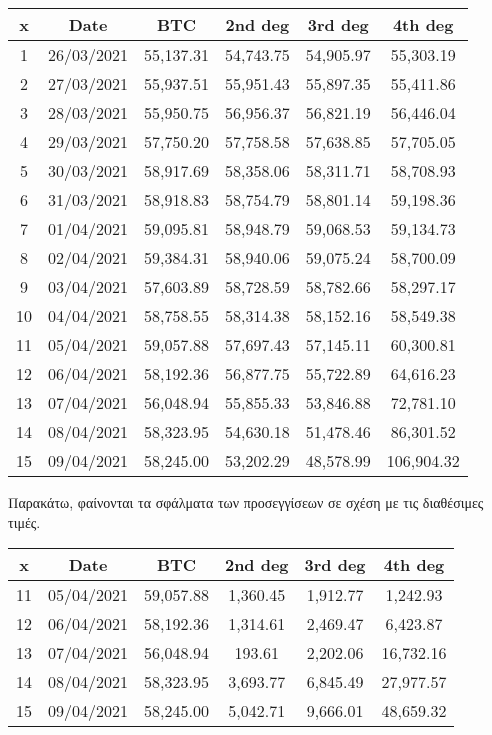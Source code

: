 \documentclass{article}
\newcommand{\lt}{\latintext}
\newcommand{\gt}{\greektext}
\begin{document}
\lt
\begin{center}
\begin{tabular}{ |c|c|c|c|c|c| }
\hline
x & Date & BTC & 2nd deg & 3rd deg & 4th deg \\
\hline
1 & 26/03/2021 & 55,137.31 & 54,743.75 & 54,905.97 & 55,303.19\\
2 & 27/03/2021 & 55,937.51 & 55,951.43 & 55,897.35 & 55,411.86\\
3 & 28/03/2021 & 55,950.75 & 56,956.37 & 56,821.19 & 56,446.04\\
4 & 29/03/2021 & 57,750.20 & 57,758.58 & 57,638.85 & 57,705.05\\
5 & 30/03/2021 & 58,917.69 & 58,358.06 & 58,311.71 & 58,708.93\\
6 & 31/03/2021 & 58,918.83 & 58,754.79 & 58,801.14 & 59,198.36\\
7 & 01/04/2021 & 59,095.81 & 58,948.79 & 59,068.53 & 59,134.73\\
8 & 02/04/2021 & 59,384.31 & 58,940.06 & 59,075.24 & 58,700.09\\
9 & 03/04/2021 & 57,603.89 & 58,728.59 & 58,782.66 & 58,297.17\\
10 & 04/04/2021 & 58,758.55 & 58,314.38 & 58,152.16 & 58,549.38\\
\hline
11 & 05/04/2021 & 59,057.88 & 57,697.43 & 57,145.11 & 60,300.81\\
12 & 06/04/2021 & 58,192.36	& 56,877.75 & 55,722.89 & 64,616.23\\
13 & 07/04/2021 & 56,048.94	& 55,855.33 & 53,846.88 & 72,781.10\\
14 & 08/04/2021 & 58,323.95	& 54,630.18 & 51,478.46 & 86,301.52\\
15 & 09/04/2021 & 58,245.00	& 53,202.29 & 48,578.99 & 106,904.32\\
\hline
\end{tabular}
\end{center}
\gt
Παρακάτω, φαίνονται τα σφάλματα των προσεγγίσεων σε σχέση με τις διαθέσιμες τιμές.
\lt
\begin{center}
\begin{tabular}{ |c|c|c|c|c|c| }
\hline
x & Date & BTC & 2nd deg & 3rd deg & 4th deg \\
\hline
11 & 05/04/2021 & 59,057.88 & 1,360.45 & 1,912.77 & 1,242.93\\
12 & 06/04/2021 & 58,192.36	& 1,314.61 & 2,469.47 & 6,423.87\\
13 & 07/04/2021 & 56,048.94	& 193.61 & 2,202.06 & 16,732.16\\
14 & 08/04/2021 & 58,323.95	& 3,693.77 & 6,845.49 & 27,977.57\\
15 & 09/04/2021 & 58,245.00	& 5,042.71 & 9,666.01 & 48,659.32\\
\hline
\end{tabular}
\end{center}
\end{document}
